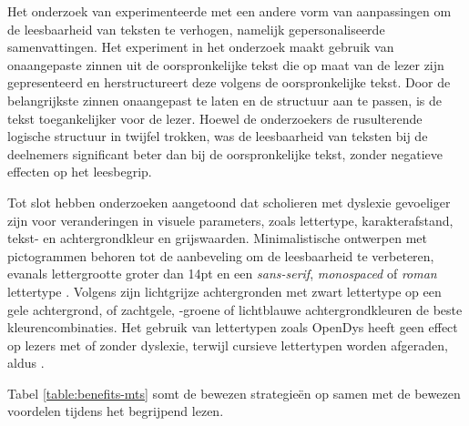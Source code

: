 \medspace

Het onderzoek van \textcite{Nandhini2013} experimenteerde met een andere vorm van aanpassingen om de leesbaarheid van teksten te verhogen, namelijk gepersonaliseerde samenvattingen. Het experiment in het onderzoek maakt gebruik van onaangepaste zinnen uit de oorspronkelijke tekst die op maat van de lezer zijn gepresenteerd en herstructureert deze volgens de oorspronkelijke tekst. Door de belangrijkste zinnen onaangepast te laten en de structuur aan te passen, is de tekst toegankelijker voor de lezer. Hoewel de onderzoekers de rusulterende logische structuur in twijfel trokken, was de leesbaarheid van teksten bij de deelnemers significant beter dan bij de oorspronkelijke tekst, zonder negatieve effecten op het leesbegrip.

\medspace

Tot slot hebben onderzoeken aangetoond dat scholieren met dyslexie gevoeliger zijn voor veranderingen in visuele parameters, zoals lettertype, karakterafstand, tekst- en achtergrondkleur en grijswaarden. Minimalistische ontwerpen met pictogrammen behoren tot de aanbeveling om de leesbaarheid te verbeteren, evanals lettergrootte groter dan 14pt en een \textit{sans-serif}, \textit{monospaced} of \textit{roman} lettertype \autocite{Rello2013b}. Volgens \textcite{Rello2015, Bezem2016, Rello2017} zijn lichtgrijze achtergronden met zwart lettertype op een gele achtergrond, of zachtgele, -groene of lichtblauwe achtergrondkleuren de beste kleurencombinaties. Het gebruik van lettertypen zoals OpenDys heeft geen effect op lezers met of zonder dyslexie, terwijl cursieve lettertypen worden afgeraden, aldus \textcite{Rello2013b, Rello2015}.

\medspace

Tabel \ref{table:benefits-mts} somt de bewezen strategieën op samen met de bewezen voordelen tijdens het begrijpend lezen.

